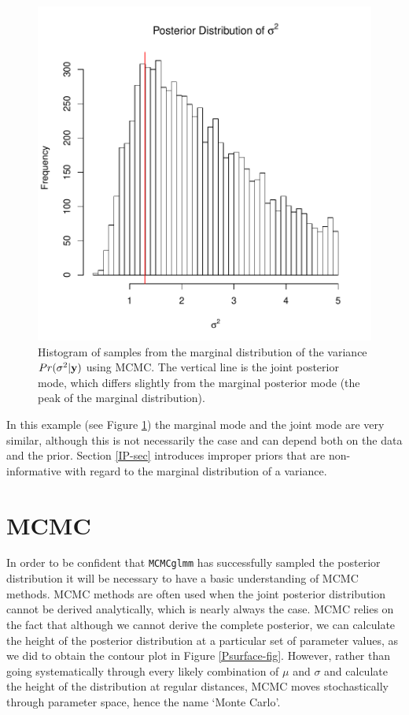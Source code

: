 \documentclass{article}
\begin{document}
\begin{figure}[!h]
\begin{center}
\includegraphics{Lecture1-049}
\end{center}
\caption{Histogram of samples from the marginal distribution of the variance $Pr(\sigma^{2} | {\bf y})$ using MCMC. The vertical line is the joint posterior mode, which differs slightly from the marginal posterior mode (the peak of the marginal distribution).}
\label{PsurfaceMCMC-fig}
\end{figure}

In this example (see Figure \ref{PsurfaceMCMC-fig}) the marginal mode and the joint mode are very similar, although this is not necessarily the case and can depend both on the data and the prior. Section \ref{IP-sec} introduces improper priors that are non-informative with regard to the marginal distribution of a variance.\\

\section{MCMC}

In order to be confident that \texttt{MCMCglmm} has successfully sampled the posterior distribution it will be necessary to have a basic understanding of MCMC methods. MCMC methods are often used when the joint posterior distribution cannot be derived analytically, which is nearly always the case. MCMC relies on the fact that although we cannot derive the complete posterior, we can calculate the height of the posterior distribution at a particular set of parameter values, as we did to obtain the contour plot in Figure \ref{Psurface-fig}. However, rather than going systematically through every likely combination of $\mu$ and $\sigma$ and calculate the height of the distribution at regular distances, MCMC moves stochastically through parameter space, hence the name `Monte Carlo'.\\   
\end{document}
